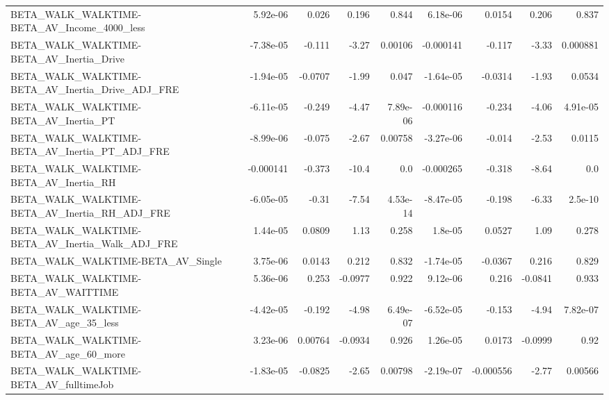 \begin{tabular}{lrrrrrrrr}
BETA\_WALK\_WALKTIME-BETA\_AV\_Income\_4000\_less        &    5.92e-06 &        0.026 &    0.196 &    0.844 &   6.18e-06 &      0.0154 &        0.206 &         0.837 \\
BETA\_WALK\_WALKTIME-BETA\_AV\_Inertia\_Drive           &   -7.38e-05 &       -0.111 &    -3.27 &  0.00106 &  -0.000141 &      -0.117 &        -3.33 &      0.000881 \\
BETA\_WALK\_WALKTIME-BETA\_AV\_Inertia\_Drive\_ADJ\_FRE   &   -1.94e-05 &      -0.0707 &    -1.99 &    0.047 &  -1.64e-05 &     -0.0314 &        -1.93 &        0.0534 \\
BETA\_WALK\_WALKTIME-BETA\_AV\_Inertia\_PT              &   -6.11e-05 &       -0.249 &    -4.47 & 7.89e-06 &  -0.000116 &      -0.234 &        -4.06 &      4.91e-05 \\
BETA\_WALK\_WALKTIME-BETA\_AV\_Inertia\_PT\_ADJ\_FRE      &   -8.99e-06 &       -0.075 &    -2.67 &  0.00758 &  -3.27e-06 &      -0.014 &        -2.53 &        0.0115 \\
BETA\_WALK\_WALKTIME-BETA\_AV\_Inertia\_RH              &   -0.000141 &       -0.373 &    -10.4 &      0.0 &  -0.000265 &      -0.318 &        -8.64 &           0.0 \\
BETA\_WALK\_WALKTIME-BETA\_AV\_Inertia\_RH\_ADJ\_FRE      &   -6.05e-05 &        -0.31 &    -7.54 & 4.53e-14 &  -8.47e-05 &      -0.198 &        -6.33 &       2.5e-10 \\
BETA\_WALK\_WALKTIME-BETA\_AV\_Inertia\_Walk\_ADJ\_FRE    &    1.44e-05 &       0.0809 &     1.13 &    0.258 &    1.8e-05 &      0.0527 &         1.09 &         0.278 \\
BETA\_WALK\_WALKTIME-BETA\_AV\_Single                  &    3.75e-06 &       0.0143 &    0.212 &    0.832 &  -1.74e-05 &     -0.0367 &        0.216 &         0.829 \\
BETA\_WALK\_WALKTIME-BETA\_AV\_WAITTIME                &    5.36e-06 &        0.253 &  -0.0977 &    0.922 &   9.12e-06 &       0.216 &      -0.0841 &         0.933 \\
BETA\_WALK\_WALKTIME-BETA\_AV\_age\_35\_less             &   -4.42e-05 &       -0.192 &    -4.98 & 6.49e-07 &  -6.52e-05 &      -0.153 &        -4.94 &      7.82e-07 \\
BETA\_WALK\_WALKTIME-BETA\_AV\_age\_60\_more             &    3.23e-06 &      0.00764 &  -0.0934 &    0.926 &   1.26e-05 &      0.0173 &      -0.0999 &          0.92 \\
BETA\_WALK\_WALKTIME-BETA\_AV\_fulltimeJob             &   -1.83e-05 &      -0.0825 &    -2.65 &  0.00798 &  -2.19e-07 &   -0.000556 &        -2.77 &       0.00566 \\

\end{tabular}
